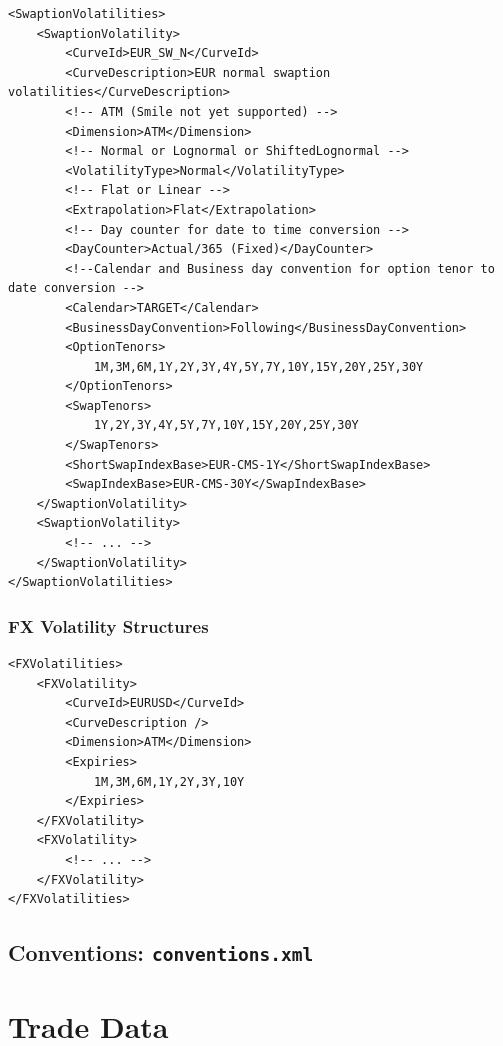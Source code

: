 \documentclass[12pt, a4paper]{article}
\begin{document}
\begin{lstlisting}[caption={Swaption volatility configuration}, 	label=lst:swaptionvol_configuration]
<SwaptionVolatilities>    
	<SwaptionVolatility>
		<CurveId>EUR_SW_N</CurveId>
		<CurveDescription>EUR normal swaption volatilities</CurveDescription>
		<!-- ATM (Smile not yet supported) -->
		<Dimension>ATM</Dimension>
		<!-- Normal or Lognormal or ShiftedLognormal -->
		<VolatilityType>Normal</VolatilityType>
		<!-- Flat or Linear -->
		<Extrapolation>Flat</Extrapolation>
		<!-- Day counter for date to time conversion -->
		<DayCounter>Actual/365 (Fixed)</DayCounter>
		<!--Calendar and Business day convention for option tenor to date conversion -->
		<Calendar>TARGET</Calendar>
		<BusinessDayConvention>Following</BusinessDayConvention>
		<OptionTenors>
			1M,3M,6M,1Y,2Y,3Y,4Y,5Y,7Y,10Y,15Y,20Y,25Y,30Y
		</OptionTenors>
		<SwapTenors>
			1Y,2Y,3Y,4Y,5Y,7Y,10Y,15Y,20Y,25Y,30Y
		</SwapTenors>
		<ShortSwapIndexBase>EUR-CMS-1Y</ShortSwapIndexBase>
		<SwapIndexBase>EUR-CMS-30Y</SwapIndexBase>
	</SwaptionVolatility>
    <SwaptionVolatility>
    	<!-- ... -->
    </SwaptionVolatility>
</SwaptionVolatilities>
\end{lstlisting}

\subsubsection{FX Volatility Structures}

\begin{lstlisting}[caption={FX option volatility configuration}, 	label=lst:fxoptionvol_configuration]
<FXVolatilities>
	<FXVolatility>
		<CurveId>EURUSD</CurveId>
		<CurveDescription />
		<Dimension>ATM</Dimension>
		<Expiries>
			1M,3M,6M,1Y,2Y,3Y,10Y
		</Expiries>
	</FXVolatility>
	<FXVolatility>
		<!-- ... -->
	</FXVolatility>
</FXVolatilities>

\end{lstlisting}

\subsection{Conventions: {\tt conventions.xml}}




\section{Trade Data}\label{sec:portfolio_data}
\end{document}
